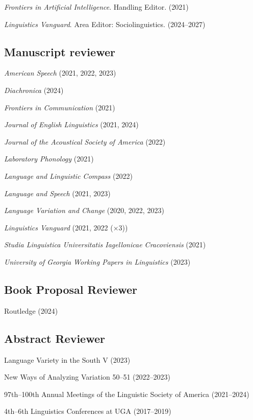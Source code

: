 \documentclass[
]{article}
\begin{document}
\emph{Frontiers in Artificial Intelligence}. Handling Editor. (2021)

\emph{Linguistics Vanguard}. Area Editor: Sociolinguistics. (2024--2027)

\hypertarget{manuscript-reviewer}{%
\subsection{Manuscript reviewer}\label{manuscript-reviewer}}

\emph{American Speech} (2021, 2022, 2023)

\emph{Diachronica} (2024)

\emph{Frontiers in Communication} (2021)

\emph{Journal of English Linguistics} (2021, 2024)

\emph{Journal of the Acoustical Society of America} (2022)

\emph{Laboratory Phonology} (2021)

\emph{Language and Linguistic Compass} (2022)

\emph{Language and Speech} (2021, 2023)

\emph{Language Variation and Change} (2020, 2022, 2023)

\emph{Linguistics Vanguard} (2021, 2022 (×3))

\emph{Studia Linguistica Universitatis Iagellonicae Cracoviensis} (2021)

\emph{University of Georgia Working Papers in Linguistics} (2023)

\hypertarget{book-proposal-reviewer}{%
\subsection{Book Proposal Reviewer}\label{book-proposal-reviewer}}

Routledge (2024)

\hypertarget{abstract-reviewer}{%
\subsection{Abstract Reviewer}\label{abstract-reviewer}}

Language Variety in the South V (2023)

New Ways of Analyzing Variation 50--51 (2022--2023)

97th--100th Annual Meetings of the Linguistic Society of America
(2021--2024)

4th--6th Linguistics Conferences at UGA (2017--2019)
\end{document}
